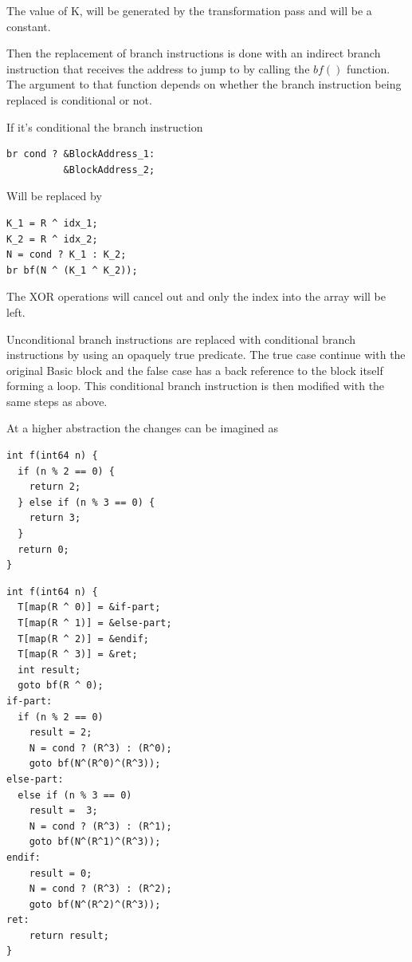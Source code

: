 The value of K, will be generated by the transformation pass and will be a constant.

Then the replacement of branch instructions is done with an indirect branch instruction that receives the address to jump to by
calling the $bf()$ function. The argument to that function depends on whether the branch instruction being replaced is
conditional or not.

If it's conditional the branch instruction

\lstset{language=C++} %
\lstset{basicstyle=\ttfamily} %
\begin{lstlisting}
br cond ? &BlockAddress_1:
          &BlockAddress_2;
\end{lstlisting}

Will be replaced by

\lstset{language=C++} %
\lstset{basicstyle=\ttfamily} %
\begin{lstlisting}
K_1 = R ^ idx_1;
K_2 = R ^ idx_2;
N = cond ? K_1 : K_2;
br bf(N ^ (K_1 ^ K_2));
\end{lstlisting}

The XOR operations will cancel out and only the index into the array will be left.

Unconditional branch instructions are replaced with conditional branch instructions by using an opaquely true predicate.
The true case continue with the original Basic block and the false case has a back reference to the block itself forming a loop.
This conditional branch instruction is then modified with the same steps as above.

At a higher abstraction the changes can be imagined as

\lstset{language=C++} %
\lstset{basicstyle=\ttfamily} %
\begin{lstlisting}
int f(int64 n) {
  if (n % 2 == 0) {
    return 2;
  } else if (n % 3 == 0) {
    return 3;
  }
  return 0;
}
\end{lstlisting}

\lstset{language=C++} %
\lstset{basicstyle=\ttfamily} %
\begin{lstlisting}
int f(int64 n) {
  T[map(R ^ 0)] = &if-part;
  T[map(R ^ 1)] = &else-part;
  T[map(R ^ 2)] = &endif;
  T[map(R ^ 3)] = &ret;
  int result;
  goto bf(R ^ 0);
if-part:
  if (n % 2 == 0)
    result = 2;
    N = cond ? (R^3) : (R^0);
    goto bf(N^(R^0)^(R^3));
else-part:
  else if (n % 3 == 0)
    result =  3;
    N = cond ? (R^3) : (R^1);
    goto bf(N^(R^1)^(R^3));
endif:
    result = 0;
    N = cond ? (R^3) : (R^2);
    goto bf(N^(R^2)^(R^3));
ret:
    return result;
}
\end{lstlisting}

